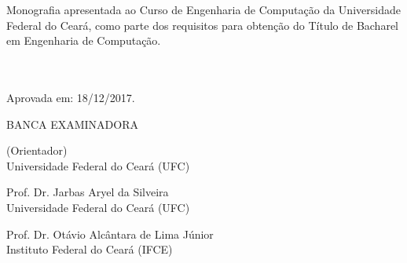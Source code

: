 \begin{folhadeaprovacao}
	
	\begin{center}
		{\MakeUppercase\imprimirautor}
		\vspace{1cm}
		
		\begin{center}
			\MakeUppercase\imprimirtitulo
		\end{center}
		
		\vspace{2cm}
		\hspace{.45\textwidth}
		\begin{minipage}{0.5\textwidth}
			Monografia apresentada ao Curso de Engenharia de Computação da Universidade Federal do Ceará, como parte dos requisitos para obtenção do Título de Bacharel em Engenharia de Computação.
			\\ \\ \\
		\end{minipage}
		
		\vspace{-0.5cm}
		
		\begin{minipage}{\textwidth}
			Aprovada em: 18/12/2017.
		\end{minipage}
		
		\vspace{0.5cm}
		BANCA EXAMINADORA
	\end{center}
	
	\def\spacebetweensigns{-12pt}
	
	\vspace{\spacebetweensigns}
	\assinatura{}
	\vspace{\spacebetweensigns}
	\begin{center}
		{\imprimirorientador \space (Orientador) \\ Universidade Federal do Ceará (UFC)}
	\end{center}
	

	
	\vspace{\spacebetweensigns}
	\assinatura{}
	\vspace{\spacebetweensigns}
	\begin{center}
		{Prof. Dr. Jarbas Aryel da Silveira \\ Universidade Federal do Ceará (UFC)}
	\end{center}
	
	\vspace{\spacebetweensigns}
	\assinatura{}
	\vspace{\spacebetweensigns}
	\begin{center}
		{Prof. Dr. Otávio Alcântara de Lima Júnior \\ Instituto Federal do Ceará (IFCE)}
	\end{center}
		
\end{folhadeaprovacao}
